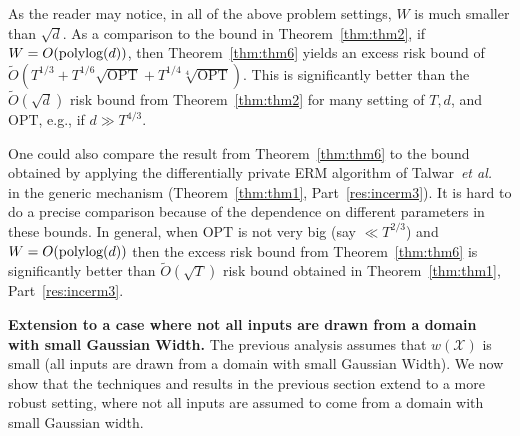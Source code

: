 \documentclass{article}
\theoremstyle{plain}
\def \polylog{\mbox{\rm polylog}}
\def \CCC {\mathcal{C}}
\def \XXX {\mathcal{X}}
\def \LLL {\mathcal{L}}
\def \OPT {{\mathrm{OPT}}}
\begin{document}
As the reader may notice, in all of the above problem settings, $W$ is much smaller than $\sqrt{d}$. As a comparison to the bound in Theorem~\ref{thm:thm2}, if  $W =O(\polylog(d))$, then Theorem~\ref{thm:thm6} yields an excess risk bound of $\tilde{O}(T^{1/3} + T^{1/6}\sqrt{\OPT} + T^{1/4} \sqrt[4]{\OPT})$. This is significantly better than the $\tilde{O}(\sqrt{d})$ risk bound from Theorem~\ref{thm:thm2} for many setting of $T,d$, and $\OPT$, e.g., if $d \gg T^{4/3}$. 


One could also compare the result from Theorem~\ref{thm:thm6} to the bound obtained by applying the differentially private ERM algorithm of Talwar~\emph{et al.}\ \cite{talwar2015nearly} in the generic mechanism (Theorem~\ref{thm:thm1}, Part~\ref{res:incerm3}). It is hard to do a precise comparison because of the dependence on different parameters in these bounds. In general, when $\OPT$ is not very big (say $\ll T^{2/3}$) and $W=O(\polylog(d))$ then the excess risk bound from Theorem~\ref{thm:thm6} is significantly better than $\tilde{O}(\sqrt{T})$ risk bound obtained in Theorem~\ref{thm:thm1}, Part~\ref{res:incerm3}.


\smallskip
\noindent\textbf{Extension to a case where not all inputs are drawn from a domain with small Gaussian Width.} The previous analysis assumes that $w(\XXX)$ is small (all inputs are drawn from a domain with small Gaussian Width). We now show that the techniques and results in the previous section extend to a more robust setting, where not all inputs are assumed to come from a domain with small Gaussian width. 
\end{document}
